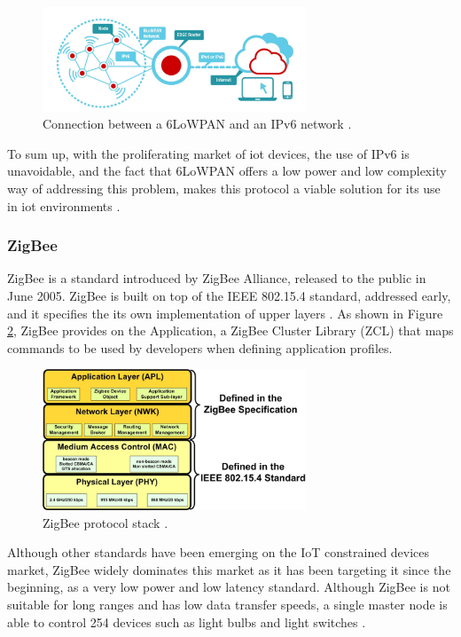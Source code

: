 \begin{figure}[H]
	\centering
	\includegraphics[width=0.7\textwidth]{figures/edge.png}
	\caption{Connection between a 6LoWPAN and an IPv6 network \cite{6low}.}
	\label{fig:6low}
\end{figure}


To sum up, with the proliferating market of \ac{iot} devices, the use of IPv6 is unavoidable, and the fact that 6LoWPAN offers a low power and low complexity way of addressing this problem, makes this protocol a viable solution for its use in \ac{iot} environments \cite{Mehboob2016}.  


\subsubsection{ZigBee}
ZigBee is a standard introduced by ZigBee Alliance, released to the public in June 2005. ZigBee is built on top of the IEEE 802.15.4 standard, addressed early, and it specifies the its own implementation of upper layers \cite{INSTEON2013}. As shown in Figure \ref{fig:zig}, ZigBee provides on the Application, a ZigBee Cluster Library (ZCL) that maps commands to be used by developers when defining application profiles.


\begin{figure}[H]
	\centering
	\includegraphics[width=0.7\textwidth]{figures/zig.jpg}
	\caption{ZigBee protocol stack \cite{article}.}
	\label{fig:zig}
\end{figure}


Although other standards have been emerging on the IoT constrained devices market, ZigBee widely dominates this market as it has been targeting it since the beginning, as a very low power and low latency standard.
Although ZigBee is not suitable for long ranges and has low data transfer speeds, a single master node is able to control 254 devices such as light bulbs and light switches \cite{Mehboob2016}. 

